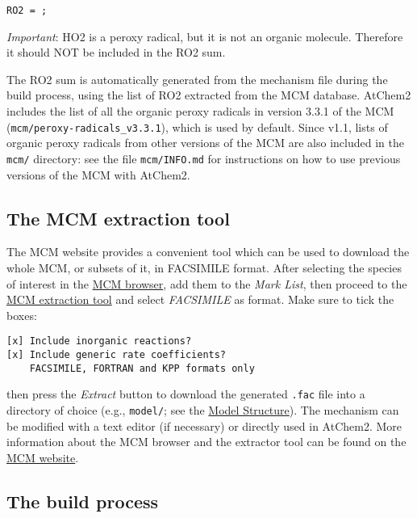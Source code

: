 \begin{verbatim}
RO2 = ;
\end{verbatim}

\emph{Important}: HO2 is a peroxy radical, but it is not an organic
molecule. Therefore it should NOT be included in the RO2 sum.

The RO2 sum is automatically generated from the mechanism file during
the build process, using the list of RO2 extracted from the MCM
database. AtChem2 includes the list of all the organic peroxy radicals
in version 3.3.1 of the MCM (\texttt{mcm/peroxy-radicals\_v3.3.1}),
which is used by default. Since v1.1, lists of organic peroxy radicals
from other versions of the MCM are also included in the \texttt{mcm/}
directory: see the file \texttt{mcm/INFO.md} for instructions on how
to use previous versions of the MCM with AtChem2.

\subsection{The MCM extraction
  tool} \label{subsec:the-mcm-extraction-tool}

The MCM website provides a convenient tool which can be used to
download the whole MCM, or subsets of it, in FACSIMILE format. After
selecting the species of interest in the
\href{http://mcm.leeds.ac.uk/MCMv3.3.1/roots.htt}{MCM browser}, add
them to the \emph{Mark List}, then proceed to the
\href{http://mcm.leeds.ac.uk/MCMv3.3.1/extract.htt}{MCM extraction
  tool} and select \emph{FACSIMILE} as format. Make sure to tick the
boxes:

\begin{verbatim}
[x] Include inorganic reactions?
[x] Include generic rate coefficients?
    FACSIMILE, FORTRAN and KPP formats only
\end{verbatim}

then press the \emph{Extract} button to download the generated
\texttt{.fac} file into a directory of choice (e.g., \texttt{model/};
see the \hyperref[sec:structure]{Model Structure}).  The mechanism can
be modified with a text editor (if necessary) or directly used in
AtChem2. More information about the MCM browser and the extractor tool
can be found on the \href{http://mcm.leeds.ac.uk}{MCM website}.

\subsection{The build process} \label{subsec:the-build-process}


